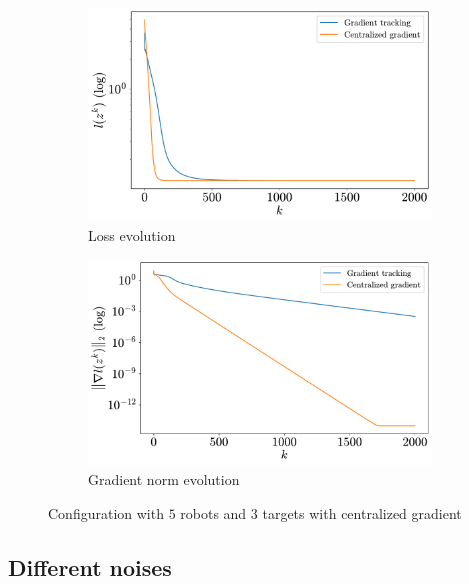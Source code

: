 \documentclass[a4paper,11pt,oneside]{book}
\begin{document}
\begin{figure}[ht]
      \centering
      \begin{subfigure}[t]{0.49\textwidth}
            \centering
            \includegraphics[width=\linewidth]{./figs/tracking/loss_centralized_5_3_2_2000.pdf} 
            \caption{Loss evolution}
      \end{subfigure}
      \hfill
      \begin{subfigure}[t]{0.49\textwidth}
            \centering
            \includegraphics[width=\linewidth]{./figs/tracking/gradient_centralized_5_3_2_2000.pdf} 
            \caption{Gradient norm evolution}
      \end{subfigure}
      \caption{Configuration with $5$ robots and $3$ targets with centralized gradient}
      \label{fig:tracking_centralized_5_3}
\end{figure}


\subsection{Different noises}
\end{document}
